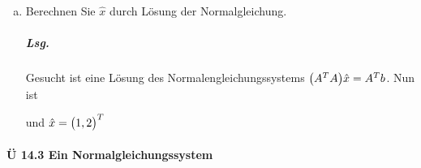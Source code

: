 \documentclass{scrreprt}
\begin{document}
\begin{enumerate}[(a)]
\newpage
\item Berechnen Sie $\hat{x}$ durch Lösung der Normalgleichung.

  \subparagraph{Lsg.} Gesucht ist eine Lösung des Normalengleichungssystems
  $\qty(A^TA)\hat{x} = A^Tb$.
  Nun ist
  und $\hat{x} = \qty\big(1, 2)^T$
\end{enumerate}

\paragraph{Ü 14.3 Ein Normalgleichungssystem} \phantom{\null}
\end{document}
